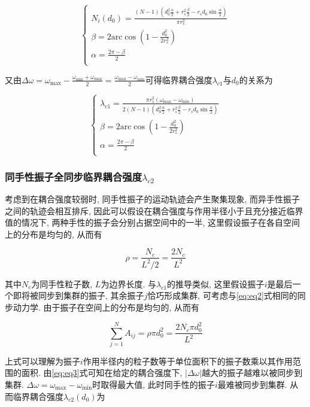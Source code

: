 \documentclass{article}
\begin{document}
$$
\begin{cases}
	N_i\left( d_0 \right) =\frac{\left( N-1 \right) \left( d_{0}^{2}\frac{\alpha}{2}+r_{s}^{2}\frac{\beta}{2}-r_sd_0\sin \frac{\alpha}{2} \right)}{\pi r_{s}^{2}}\\
	\beta =2\mathrm{arc}\cos \left( 1-\frac{d_{0}^{2}}{2r_{s}^{2}} \right)\\
	\alpha =\frac{2\pi -\beta}{2}\\
\end{cases}
$$

又由$\Delta \omega =\omega _{\max}-\frac{\omega _{\min}+\omega _{\max}}{2}=\frac{\omega _{\max}-\omega _{\min}}{2}$可得临界耦合强度$\lambda _{c1}$与$d_0$的关系为

$$
\begin{cases}
	\lambda _{c1}=\frac{\pi r_{s}^{2}\left( \omega _{\max}-\omega _{\min} \right)}{2\left( N-1 \right) \left( d_{0}^{2}\frac{\alpha}{2}+r_{s}^{2}\frac{\beta}{2}-r_sd_0\sin \frac{\alpha}{2} \right)}\\
	\beta =2\mathrm{arc}\cos \left( 1-\frac{d_{0}^{2}}{2r_{s}^{2}} \right)\\
	\alpha =\frac{2\pi -\beta}{2}\\
\end{cases}
$$

\subsubsection{同手性振子全同步临界耦合强度$\lambda_{c2}$}

考虑到在耦合强度较弱时, 同手性振子的运动轨迹会产生聚集现象, 而异手性振子之间的轨迹会相互排斥, 因此可以假设在耦合强度与作用半径小于且充分接近临界值的情况下, 两种手性的振子会分别占据空间中的一半, 这里假设振子在各自空间上的分布是均匀的, 从而有

\begin{equation}\label{eq:eq5.5}
	\rho =\frac{N_c}{L^2/2}=\frac{2N_c}{L^2}
\end{equation}

其中$N_c$为同手性粒子数, $L$为边界长度. 与$\lambda_{c1}$的推导类似, 这里假设振子$i$是最后一个即将被同步到集群的振子, 其余振子$j$恰巧形成集群, 可考虑与\ref{eq:eq2}式相同的同步动力学. 由于振子在空间上的分布是均匀的, 从而有

$$
\sum_{j=1}^N{A_{ij}}=\rho \pi d_{0}^{2}=\frac{2N_c\pi d_{0}^{2}}{L^2}
$$

上式可以理解为振子$i$作用半径内的粒子数等于单位面积下的振子数乘以其作用范围的面积. 由\ref{eq:eq3}式可知在给定的耦合强度下, $\left| \Delta \omega \right|$越大的振子越难以被同步到集群. $\Delta \omega =\omega _{\max}-\omega _{\min}$时取得最大值, 此时同手性的振子$i$最难被同步到集群. 从而临界耦合强度$\lambda_{c2}(d_0)$为
\end{document}
